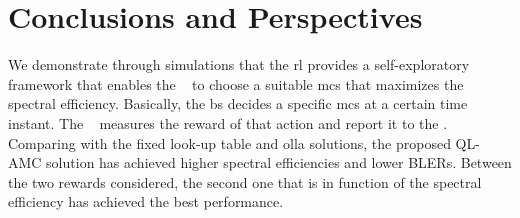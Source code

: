 \section{Conclusions and Perspectives}
\label{sec:amc-conclusion}
We demonstrate through simulations that the \gls{rl} provides a self-exploratory framework that enables the \base~ to choose a suitable \gls{mcs} that maximizes the spectral efficiency.
%
Basically, the \gls{bs} decides a specific \gls{mcs} at a certain time instant. The \ue~ measures the reward of that action and report it to the \base.
%
Comparing with the fixed look-up table and \gls{olla} solutions, the proposed QL-AMC solution has achieved higher spectral efficiencies and lower BLERs.
%
Between the two rewards considered, the second one that is in function of the spectral efficiency has achieved the best performance.
%
%
%

